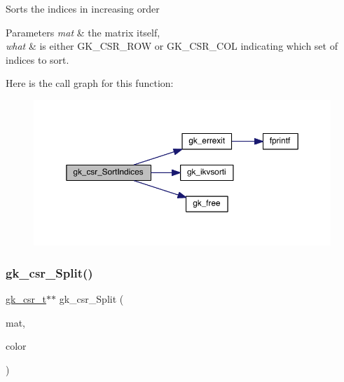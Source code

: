 Sorts the indices in increasing order 
\begin{DoxyParams}{Parameters}
{\em mat} & the matrix itself, \\
\hline
{\em what} & is either G\+K\+\_\+\+C\+S\+R\+\_\+\+R\+OW or G\+K\+\_\+\+C\+S\+R\+\_\+\+C\+OL indicating which set of indices to sort. \\
\hline
\end{DoxyParams}
Here is the call graph for this function\+:\nopagebreak
\begin{figure}[H]
\begin{center}
\leavevmode
\includegraphics[width=350pt]{a00077_a06ffa04d1369de42ae3b7d2a9f85b91d_cgraph}
\end{center}
\end{figure}
\mbox{\label{a00077_ac438fca404c3f1ff6989aa68f83ed241}} 
\subsubsection{\texorpdfstring{gk\+\_\+csr\+\_\+\+Split()}{gk\_csr\_Split()}}
{\footnotesize\ttfamily \hyperlink{a00634}{gk\+\_\+csr\+\_\+t}$\ast$$\ast$ gk\+\_\+csr\+\_\+\+Split (\begin{DoxyParamCaption}\item[{\hyperlink{a00634}{gk\+\_\+csr\+\_\+t} $\ast$}]{mat,  }\item[{int $\ast$}]{color }\end{DoxyParamCaption})}

